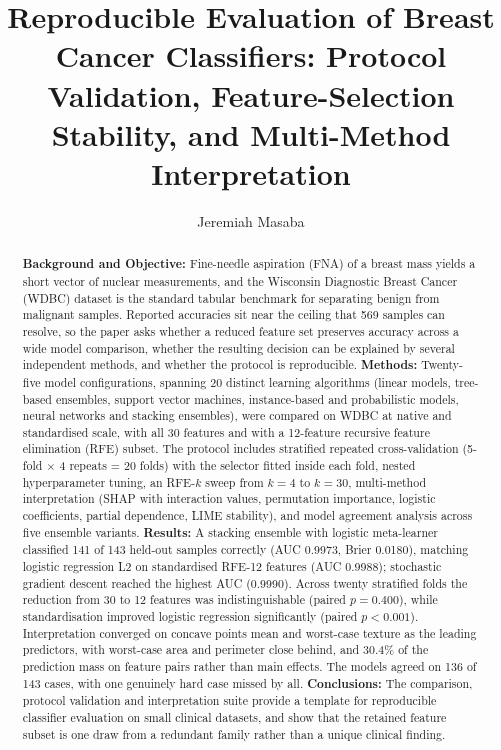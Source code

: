 \documentclass[review,12pt]{elsarticle}
\begin{document}
\begin{frontmatter}

\title{Reproducible Evaluation of Breast Cancer Classifiers: Protocol Validation, Feature-Selection Stability, and Multi-Method Interpretation}

\author[inst1]{Jeremiah Masaba}
\address[inst1]{Department of Computer Science, School of Computing and Informatics Technology, Makerere University, Kampala, Uganda, P.O. Box 7061}

\begin{abstract}
\textbf{Background and Objective:} Fine-needle aspiration (FNA) of a breast mass yields a short vector of nuclear measurements, and the Wisconsin Diagnostic Breast Cancer (WDBC) dataset is the standard tabular benchmark for separating benign from malignant samples. Reported accuracies sit near the ceiling that 569 samples can resolve, so the paper asks whether a reduced feature set preserves accuracy across a wide model comparison, whether the resulting decision can be explained by several independent methods, and whether the protocol is reproducible.
\textbf{Methods:} Twenty-five model configurations, spanning 20 distinct learning algorithms (linear models, tree-based ensembles, support vector machines, instance-based and probabilistic models, neural networks and stacking ensembles), were compared on WDBC at native and standardised scale, with all 30 features and with a 12-feature recursive feature elimination (RFE) subset. The protocol includes stratified repeated cross-validation (5-fold $\times$ 4 repeats = 20 folds) with the selector fitted inside each fold, nested hyperparameter tuning, an RFE-$k$ sweep from $k=4$ to $k=30$, multi-method interpretation (SHAP with interaction values, permutation importance, logistic coefficients, partial dependence, LIME stability), and model agreement analysis across five ensemble variants.
\textbf{Results:} A stacking ensemble with logistic meta-learner classified 141 of 143 held-out samples correctly (AUC 0.9973, Brier 0.0180), matching logistic regression L2 on standardised RFE-12 features (AUC 0.9988); stochastic gradient descent reached the highest AUC (0.9990). Across twenty stratified folds the reduction from 30 to 12 features was indistinguishable (paired $p=0.400$), while standardisation improved logistic regression significantly (paired $p<0.001$). Interpretation converged on concave points mean and worst-case texture as the leading predictors, with worst-case area and perimeter close behind, and 30.4\% of the prediction mass on feature pairs rather than main effects. The models agreed on 136 of 143 cases, with one genuinely hard case missed by all.
\textbf{Conclusions:} The comparison, protocol validation and interpretation suite provide a template for reproducible classifier evaluation on small clinical datasets, and show that the retained feature subset is one draw from a redundant family rather than a unique clinical finding.
\end{abstract}


\end{frontmatter}
\end{document}
